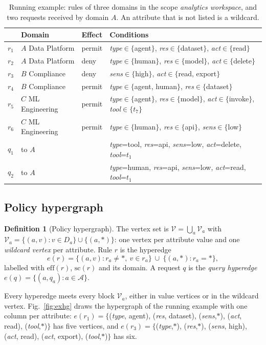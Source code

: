 \documentclass[preprint,12pt]{elsarticle}
\theoremstyle{definition}
\newtheorem{definition}{Definition}
\newcommand{\eff}{\mathrm{eff}}
\newcommand{\scp}{\mathrm{sc}}
\begin{document}
\begin{table}[t]
\caption{Running example: rules of three domains in the scope \emph{analytics workspace}, and two requests received by domain $A$. An attribute that is not listed is a wildcard.}
\label{tab:example}
\centering\footnotesize
\begin{tabularx}{\linewidth}{@{}lllX@{}}
\toprule
& Domain & Effect & Conditions\\
\midrule
$r_1$ & $A$ Data Platform & permit & \textit{type}$\in\{$agent$\}$, \textit{res}$\in\{$dataset$\}$, \textit{act}$\in\{$read$\}$\\
$r_2$ & $A$ Data Platform & deny & \textit{type}$\in\{$human$\}$, \textit{res}$\in\{$model$\}$, \textit{act}$\in\{$delete$\}$\\
$r_3$ & $B$ Compliance & deny & \textit{sens}$\in\{$high$\}$, \textit{act}$\in\{$read, export$\}$\\
$r_4$ & $B$ Compliance & permit & \textit{type}$\in\{$agent, human$\}$, \textit{res}$\in\{$dataset$\}$\\
$r_5$ & $C$ ML Engineering & permit & \textit{type}$\in\{$agent$\}$, \textit{res}$\in\{$model$\}$, \textit{act}$\in\{$invoke$\}$, \textit{tool}$\in\{t_7\}$\\
$r_6$ & $C$ ML Engineering & permit & \textit{type}$\in\{$human$\}$, \textit{res}$\in\{$api$\}$, \textit{sens}$\in\{$low$\}$\\
\midrule
$q_1$ & to $A$ & & \textit{type}=tool, \textit{res}=api, \textit{sens}=low, \textit{act}=delete, \textit{tool}=$t_1$\\
$q_2$ & to $A$ & & \textit{type}=human, \textit{res}=api, \textit{sens}=low, \textit{act}=read, \textit{tool}=$t_1$\\
\bottomrule
\end{tabularx}
\end{table}

\subsection{Policy hypergraph}
\begin{definition}[Policy hypergraph]
\label{def:hg}
The vertex set is $\mathcal{V}=\bigcup_{a}\mathcal{V}_a$ with $\mathcal{V}_a=\{(a,v): v\in D_a\}\cup\{(a,\ast)\}$: one vertex per attribute value and one \emph{wildcard vertex} per attribute. Rule $r$ is the hyperedge
\[ e(r)=\{(a,v): r_a\neq\ast,\ v\in r_a\}\ \cup\ \{(a,\ast): r_a=\ast\}, \]
labelled with $\eff(r)$, $\scp(r)$ and its domain. A request $q$ is the \emph{query hyperedge} $e(q)=\{(a,q_a): a\in\mathcal{A}\}$.
\end{definition}
Every hyperedge meets every block $\mathcal{V}_a$, either in value vertices or in the wildcard vertex. Fig.~\ref{fig:exhg} draws the hypergraph of the running example with one column per attribute: $e(r_1)=\{$(\textit{type}, agent), (\textit{res}, dataset), (\textit{sens},$\ast$), (\textit{act}, read), (\textit{tool},$\ast$)$\}$ has five vertices, and $e(r_3)=\{$(\textit{type},$\ast$), (\textit{res},$\ast$), (\textit{sens}, high), (\textit{act}, read), (\textit{act}, export), (\textit{tool},$\ast$)$\}$ has six.
\end{document}
